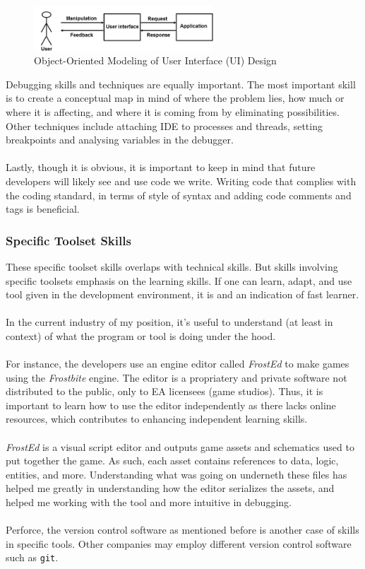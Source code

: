 \documentclass[10pt,letterpaper]{article}
\begin{document}
\begin{figure}[H]
	\centering
	\includegraphics[width=0.6\textwidth]{assets/ooppui}
	\caption{Object-Oriented Modeling of User Interface (UI) Design\cite{oopp}}
	\label{fig:ooppui}
\end{figure}

Debugging skills and techniques are equally important. The most important skill is to create a conceptual map in mind of where the problem lies, how much or where it is affecting, and where it is coming from by eliminating possibilities. Other techniques include attaching IDE to processes and threads, setting breakpoints and analysing variables in the debugger.\\
\\
Lastly, though it is obvious, it is important to keep in mind that future developers will likely see and use code we write. Writing code that complies with the coding standard, in terms of style of syntax and adding code comments and tags is beneficial.

\subsubsection{Specific Toolset Skills}

These specific toolset skills overlaps with technical skills. But skills involving specific toolsets emphasis on the learning skills. If one can learn, adapt, and use tool given in the development environment, it is and an indication of fast learner.\\
\\
In the current industry of my position, it's useful to understand (at least in context) of what the program or tool is doing under the hood.\\
\\
For instance, the developers use an engine editor called \textit{FrostEd} to make games using the \textit{Frostbite} engine. The editor is a propriatery and private software not distributed to the public, only to EA licensees (game studios). Thus, it is important to learn how to use the editor independently as there lacks online resources, which contributes to enhancing independent learning skills.\\
\\
\textit{FrostEd} is a visual script editor and outputs game assets and schematics used to put together the game. As such, each asset contains references to data, logic, entities, and more. Understanding what was going on underneth these files has helped me greatly in understanding how the editor serializes the assets, and helped me working with the tool and more intuitive in debugging.\\
\\
Perforce, the version control software as mentioned before is another case of skills in specific tools\cite{perforce}. Other companies may employ different version control software such as \texttt{git}\cite{git}.\\
\end{document}
